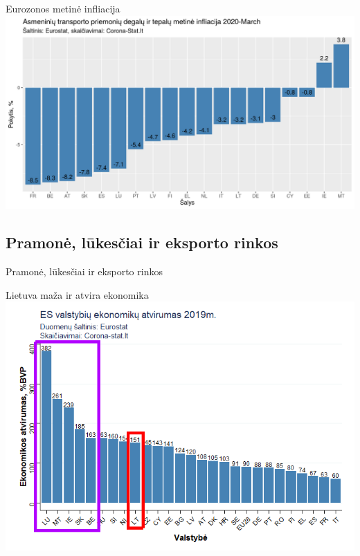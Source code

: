 \documentclass[aspectratio=169, 11pt]{beamer}
\begin{document}


\begin{frame}{Eurozonos metinė infliacija}
\centering
\includegraphics[scale=0.575]{infliacija_degalai.png}
\end{frame}

\subsection{Pramonė, lūkesčiai ir eksporto rinkos}

\begin{frame}
\begin{LARGE}
Pramonė, lūkesčiai ir eksporto rinkos
\end{LARGE}
\end{frame}

\begin{frame}{Lietuva maža ir atvira ekonomika}
\centering
\includegraphics[scale=0.45]{atvirumas.png}
\end{frame}
\end{document}
